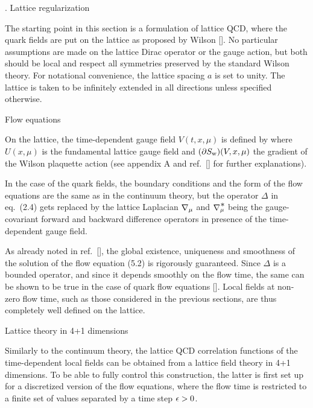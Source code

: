 
. Lattice regularization

The starting point in this section is a formulation of lattice
QCD, where the quark fields are put on the lattice as proposed
by Wilson [\cite{Wilson}]. 
No particular assumptions
are made on the lattice Dirac operator or the gauge action,
but both should be local and respect all symmetries preserved
by the standard Wilson theory. For notational convenience,
the lattice spacing $a$ is set to unity.
The lattice is taken to be infinitely extended in all directions 
unless specified otherwise.


 Flow equations

On the lattice, the time-dependent gauge field $V(t,x,\mu)$ is
defined by 
where $U(x,\mu)$ is the fundamental lattice gauge field 
and $(\partial S_{\rm w})(V,x,\mu)$ the gradient of the
Wilson plaquette action (see appendix A and
ref.~[\cite{WilsonFlow}] for further explanations).

In the case of the quark fields, the boundary conditions 
and the form of the flow equations are the same as 
in the continuum theory, but the operator $\Delta$
in eq.~(2.4) gets replaced by the lattice Laplacian
\equation{
  \Delta=\nabstar{\mu}\nab{\mu},
  \enum
}
${\nabla_{\mu}}$ and $\nabstar{\mu}$
being the gauge-covariant forward and backward
difference operators in presence of the time-dependent gauge field.

As already noted in ref.~[\cite{WilsonFlow}],
the global existence, uniqueness and smoothness of the solution
of the flow equation (5.2) is rigorously guaranteed.
Since $\Delta$ is a bounded operator, and since
it depends smoothly on the flow time, the 
same can be shown to be true in the case of quark flow equations
[\cite{ArnoldI}].
Local fields at non-zero flow time, such as those considered
in the previous sections, are thus completely well defined
on the lattice.


 Lattice theory in 4+1 dimensions

Similarly to the continuum theory,
the lattice QCD correlation functions of the 
time-dependent local fields can be obtained
from a lattice field theory in 4+1 dimensions.
To be able to fully control this construction,
the latter is first set up for a discretized
version of the flow equations, where the flow time is restricted
to a finite set
of values
separated by a time step $\epsilon>0$. 

